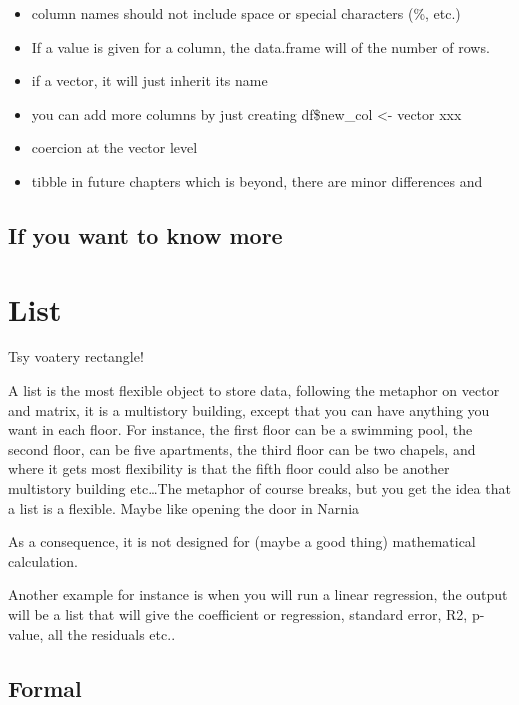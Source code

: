 \documentclass[
  letterpaper,
  DIV=11,
  numbers=noendperiod]{scrreprt}
\providecommand{\tightlist}{%
  \setlength{\itemsep}{0pt}\setlength{\parskip}{0pt}}
\begin{document}
\begin{itemize}
\tightlist
\item
  column names should not include space or special characters (\%, etc.)
\item
  If a value is given for a column, the data.frame will of the number of
  rows.
\item
  if a vector, it will just inherit its name
\item
  you can add more columns by just creating df\$new\_col \textless-
  vector xxx
\item
  coercion at the vector level
\item
  tibble in future chapters which is beyond, there are minor differences
  and
\end{itemize}

\section*{If you want to know more}\label{if-you-want-to-know-more-2}


\chapter{List}\label{sec-list}

Tsy voatery rectangle!

A list is the most flexible object to store data, following the metaphor
on vector and matrix, it is a multistory building, except that you can
have anything you want in each floor. For instance, the first floor can
be a swimming pool, the second floor, can be five apartments, the third
floor can be two chapels, and where it gets most flexibility is that the
fifth floor could also be another multistory building etc\ldots The
metaphor of course breaks, but you get the idea that a list is a
flexible. Maybe like opening the door in Narnia

As a consequence, it is not designed for (maybe a good thing)
mathematical calculation.

Another example for instance is when you will run a linear regression,
the output will be a list that will give the coefficient or regression,
standard error, R2, p-value, all the residuals etc..

\section*{Formal}\label{formal-38}
\end{document}
